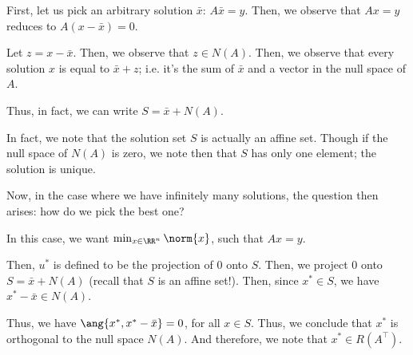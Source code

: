 \documentclass[openany]{book}
\begin{document}
\begin{example}
	First, let us pick an arbitrary solution $\bar x$: $A \bar x = y$. Then, we observe that $Ax = y$ reduces to $A(x - \bar x) = 0$.
	
	Let $z = x - \bar x$. Then, we observe that $z \in N(A)$. Then, we observe that every solution $x$ is equal to $\bar x + z$; i.e. it's the sum of $\bar x$ and a vector in the null space of $A$.
\end{example}

Thus, in fact, we can write $S = \bar x + N(A)$.

\begin{rmk}
	In fact, we note that the solution set $S$ is actually an affine set. Though if the null space of $N(A)$ is zero, we note then that $S$ has only one element; the solution is unique.
\end{rmk}

Now, in the case where we have infinitely many solutions, the question then arises: how do we pick the best one?

In this case, we want $\min_{x \in \RR^{n}} \norm{x}$, such that $Ax = y$.

Then, $u^{*}$ is defined to be the projection of $0$ onto $S$. Then, we project $0$ onto $S = \bar x + N(A)$ (recall that $S$ is an affine set!). Then, since $x^{*} \in S$, we have $x^{*} - \bar x \in N(A)$.

Thus, we have $\ang{x^{*}, x^{*} - \bar x} = 0$, for all $x \in S$. Thus, we conclude that $x^{*}$ is orthogonal to the null space $N(A)$. And therefore, we note that $x^{*} \in R(A^{\intercal})$.
\end{document}
